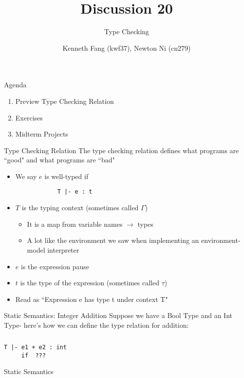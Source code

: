 \documentclass{beamer}
\title{Discussion 20}
\subtitle{Type Checking}
\author{Kenneth Fang (kwf37), Newton Ni (cn279)}
\begin{document}
    \begin{frame}
        \titlepage{}
    \end{frame}
    
    \begin{frame}{Agenda}
    \begin{enumerate}
        \item Preview Type Checking Relation
        \item Exercises
        \item Midterm Projects
    \end{enumerate}
    \end{frame}
    
    \begin{frame}[fragile]{Type Checking Relation}
    The type checking relation defines what programs are ``good" and what programs are ``bad" \pause 
        \begin{itemize}
        \item We say $e$ is well-typed if
        \begin{verbatim}
            T |- e : t
        \end{verbatim} \pause
            \item $T$ is the typing context (sometimes called $\Gamma$)
                \begin{itemize}
                    \item It is a map from variable names $\to$ types
                    \item A lot like the environment we saw when implementing an environment-model interpreter
                \end{itemize} \pause
            \item $e$ is the expression pause
            \item $t$ is the type of the expression (sometimes called $\tau$) \pause 
            \item Read as ``Expression e has type t under context T"
        \end{itemize}
    \end{frame}
    
    \begin{frame}[fragile]{Static Semantics: Integer Addition}
    Suppose we have a Bool Type and an Int Type- here's how we can define the type relation for addition:
    \begin{columns}
        \begin{column}{0.48\textwidth}
\begin{verbatim}
T |- e1 + e2 : int
     if  ???
\end{verbatim}
    Static Semantics
        \end{column}
        \begin{column}{0.48\textwidth}
        \end{column}
    \end{columns}
    \end{frame}
    
\end{document}
